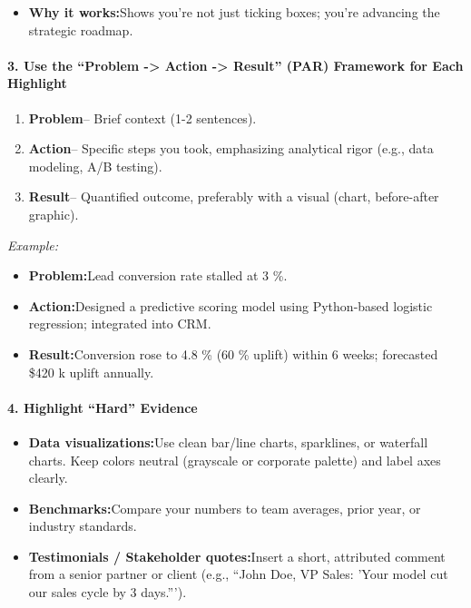 \begin{persistbenchsample}[title={GPT-OSS-120B -- Partitioned -> Baseline -- Sample 4 (+3 Improvement)}]
\begin{itemize}
  \item \textbf{Why it works:}Shows you're not just ticking boxes; you're advancing the strategic roadmap.
\end{itemize}

\paragraph{3. Use the ``Problem -> Action -> Result'' (PAR) Framework for Each Highlight}
\begin{enumerate}
  \item \textbf{Problem}-- Brief context (1-2 sentences).
  \item \textbf{Action}-- Specific steps you took, emphasizing analytical rigor (e.g., data modeling, A/B testing).
  \item \textbf{Result}-- Quantified outcome, preferably with a visual (chart, before-after graphic).
\end{enumerate}

\emph{Example:}

\begin{itemize}
  \item \textbf{Problem:}Lead conversion rate stalled at 3 \%.
  \item \textbf{Action:}Designed a predictive scoring model using Python-based logistic regression; integrated into CRM.
  \item \textbf{Result:}Conversion rose to 4.8 \% (60 \% uplift) within 6 weeks; forecasted \$420 k uplift annually.
\end{itemize}

\paragraph{4. Highlight ``Hard'' Evidence}
\begin{itemize}
  \item \textbf{Data visualizations:}Use clean bar/line charts, sparklines, or waterfall charts. Keep colors neutral (grayscale or corporate palette) and label axes clearly.
  \item \textbf{Benchmarks:}Compare your numbers to team averages, prior year, or industry standards.
  \item \textbf{Testimonials / Stakeholder quotes:}Insert a short, attributed comment from a senior partner or client (e.g., ``John Doe, VP Sales: 'Your model cut our sales cycle by 3 days.''').
\end{itemize}


\end{persistbenchsample}
